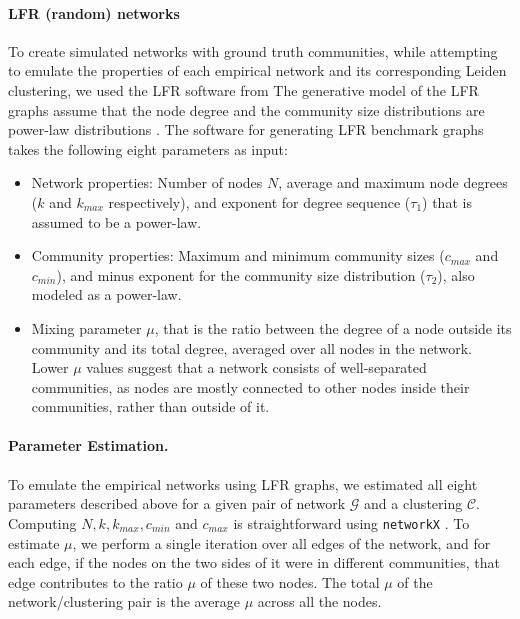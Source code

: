 \documentclass[11pt]{article}   	%
\begin{document}
\paragraph{LFR (random) networks}

To create simulated networks with ground truth communities, while attempting to emulate the properties of each empirical network and its corresponding Leiden clustering, we used the LFR software from \cite{lancichinetti2008benchmark}  The generative model of the LFR graphs assume that the node degree and the community size distributions are power-law distributions  \citep{albert2002statistical}.
The software for generating LFR benchmark graphs \citep{fortunato-resources} 
takes the following eight parameters as input:
\begin{itemize}
    \item  Network properties: Number of nodes $N$, average and maximum node degrees ($k$ and $k_{max}$ respectively), and exponent for degree sequence ($\tau_1$) that is assumed to be a power-law.
    \item Community properties: Maximum and minimum community sizes ($c_{max}$ and $c_{min}$), and minus exponent for the community size distribution ($\tau_2$), also modeled as a power-law.
    \item Mixing parameter $\mu$, that is the ratio between the degree of a node outside its community and its total degree, averaged over all nodes in the network. Lower $\mu$ values suggest that a network consists of well-separated communities, as nodes are mostly connected to other nodes inside their communities, rather than outside of it.
\end{itemize}






\paragraph{Parameter Estimation.} To emulate the empirical networks using LFR graphs, we estimated all eight parameters described above for a given pair of network $\mathcal{G}$ and a clustering $\mathcal{C}$. Computing $N, k, k_{max}, c_{min}$ and $c_{max}$ is straightforward using \texttt{networkX} \citep{hagberg2008exploring}. To estimate $\mu$, we perform a single iteration over all edges of the network, and for each edge, if the nodes on the two sides of it were in different communities, that edge contributes to the ratio $\mu$ of these two nodes. The total $\mu$ of the network/clustering pair is the average $\mu$ across all the nodes.
\end{document}
